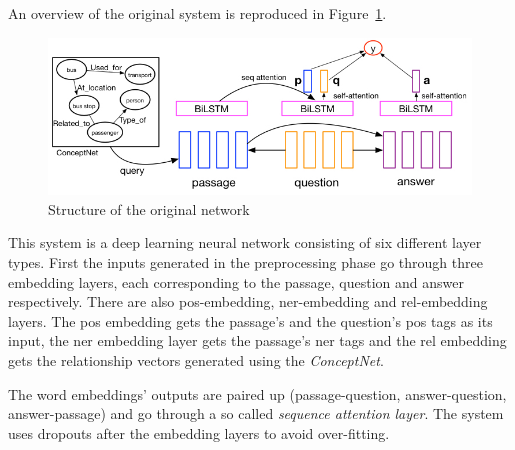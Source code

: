 An overview of the original system is reproduced in Figure~\ref{fig:dnn}.
\begin{figure}
	\centering
	\includegraphics[scale=0.5]{TriAN.jpg}
	\caption{Structure of the original network \cite[p.2]{Wang:2018}}
	\label{fig:dnn}
\end{figure}
This system is a deep learning neural network consisting of six different layer types. First the inputs generated in the preprocessing phase go through three embedding layers, each corresponding to the passage, question and answer respectively. There are also pos-embedding, ner-embedding and rel-embedding layers. The pos embedding gets the passage's and the question's pos tags as its input, the ner embedding layer gets the passage's ner tags and the rel embedding gets the relationship vectors generated using the \textit{ConceptNet}.

The word embeddings' outputs are paired up (passage-question, answer-question, answer-passage) and go through a so called \textit{sequence attention layer}.
The system uses dropouts after the embedding layers to avoid over-fitting.